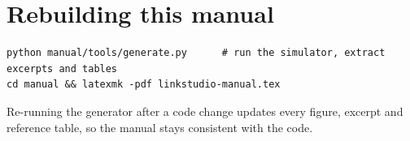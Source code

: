 \section*{Rebuilding this manual}
\begin{lstlisting}[style=shell]
python manual/tools/generate.py      # run the simulator, extract excerpts and tables
cd manual && latexmk -pdf linkstudio-manual.tex
\end{lstlisting}
Re-running the generator after a code change updates every figure, excerpt and reference
table, so the manual stays consistent with the code.
